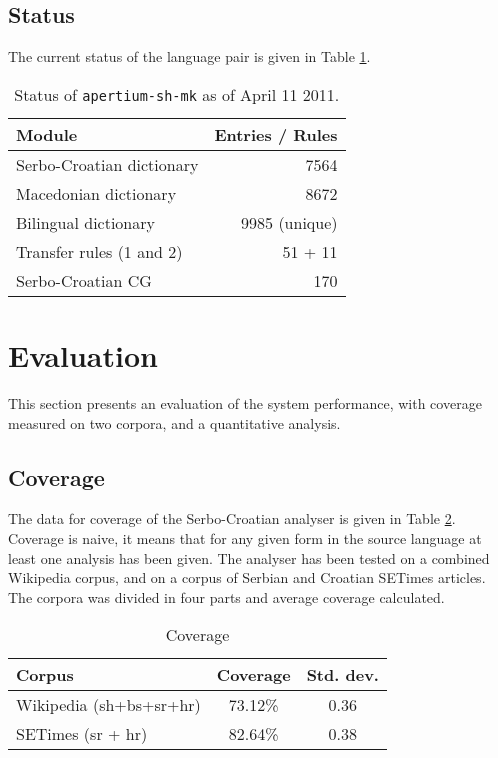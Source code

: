 \documentclass{book}
\begin{document}
\subsection*{Status}
The current status of the language pair is given in Table \ref{tab:status}.

\begin{table}
\begin{center}
\caption{Status of \texttt{apertium-sh-mk} as of April 11 2011.}
\label{tab:status}
\begin{tabular}{l|r}
Module & Entries / Rules \\
\hline
Serbo-Croatian dictionary & 7564 \\
Macedonian dictionary & 8672 \\
Bilingual dictionary & 9985 (unique) \\
Transfer rules (1 and 2) & 51 + 11 \\
Serbo-Croatian CG & 170 \\
\hline
\end{tabular}
\end{center}
\end{table}

\section{Evaluation}

This section presents an evaluation of the system performance, with
coverage measured on two corpora, and a quantitative analysis.

\subsection*{Coverage}

The data for coverage of the Serbo-Croatian analyser is 
given in Table \ref{tab:coverage}. Coverage is naive, 
it means that for any given form in the source language at least one analysis
has been given. The analyser has been tested on a combined Wikipedia
corpus, and on a corpus of Serbian and Croatian
SETimes articles. The corpora was divided in four parts and average 
coverage calculated.

\begin{table}
\begin{center}
\caption{Coverage}
\label{tab:coverage}
\begin{tabular}{l|c|c}
Corpus & Coverage & Std. dev. \\
\hline
Wikipedia (sh+bs+sr+hr) & 73.12\% & 0.36 \\
SETimes (sr + hr) & 82.64\% & 0.38 \\
\hline
\end{tabular}
\end{center}
\end{table}
\end{document}
